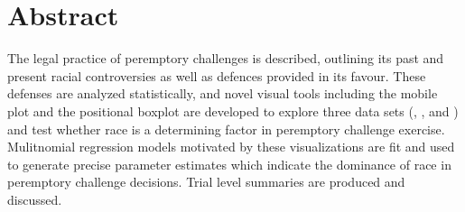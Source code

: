 \chapter*{Abstract}

The legal practice of peremptory challenges is described, outlining its past and present racial controversies as well as defences
provided in its favour. These defenses are analyzed statistically, and novel visual tools including the mobile plot and the
positional boxplot are developed to explore three data sets (\cite{JurySunshineProj}, \cite{StubbornLegacy}, and
\cite{PerempChalMurder}) and test whether race is a determining factor in peremptory challenge exercise. Mulitnomial regression
models motivated by these visualizations are fit and used to generate precise parameter estimates which indicate the dominance of
race in peremptory challenge decisions. Trial level summaries are produced and discussed.
 

